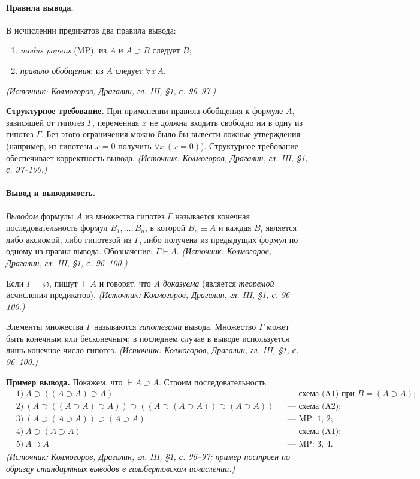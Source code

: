 \documentclass[a4paper,12pt]{article}
\begin{document}
\paragraph{Правила вывода.} В исчислении предикатов два правила вывода:
\begin{enumerate}[label=\arabic*)]
\item \emph{modus ponens} (MP): из \(A\) и \(A\supset B\) следует \(B\);
\item \emph{правило обобщения}: из \(A\) следует \(\forall x\,A\).
\end{enumerate}
\textit{(Источник: Колмогоров, Драгалин, гл. III, §1, с. 96--97.)}

\textbf{Структурное требование.} При применении правила обобщения к формуле \(A\), зависящей от гипотез \(\Gamma\), переменная \(x\) не должна входить свободно ни в одну из гипотез \(\Gamma\). Без этого ограничения можно было бы вывести ложные утверждения (например, из гипотезы \(x=0\) получить \(\forall x\,(x=0)\)). Структурное требование обеспечивает корректность вывода.
\textit{(Источник: Колмогоров, Драгалин, гл. III, §1, с. 97--100.)}

\paragraph{Вывод и выводимость.} \emph{Выводом} формулы \(A\) из множества гипотез \(\Gamma\) называется конечная последовательность формул \(B_1,\ldots,B_n\), в которой \(B_n\equiv A\) и каждая \(B_i\) является либо аксиомой, либо гипотезой из \(\Gamma\), либо получена из предыдущих формул по одному из правил вывода. Обозначение: \(\Gamma\vdash A\).
\textit{(Источник: Колмогоров, Драгалин, гл. III, §1, с. 96--100.)}

Если \(\Gamma=\varnothing\), пишут \(\vdash A\) и говорят, что \(A\) \emph{доказуема} (является \emph{теоремой} исчисления предикатов).
\textit{(Источник: Колмогоров, Драгалин, гл. III, §1, с. 96--100.)}

Элементы множества \(\Gamma\) называются \emph{гипотезами} вывода. Множество \(\Gamma\) может быть конечным или бесконечным; в последнем случае в выводе используется лишь конечное число гипотез.
\textit{(Источник: Колмогоров, Драгалин, гл. III, §1, с. 96--100.)}

\textbf{Пример вывода.} Покажем, что \(\vdash A\supset A\). Строим последовательность:
\[
\begin{aligned}
&1)\ A\supset((A\supset A)\supset A) &&\text{— схема (A1) при }B=(A\supset A);\\
&2)\ (A\supset((A\supset A)\supset A))\supset((A\supset(A\supset A))\supset(A\supset A)) &&\text{— схема (A2)};\\
&3)\ (A\supset(A\supset A))\supset(A\supset A) &&\text{— MP: 1, 2};\\
&4)\ A\supset(A\supset A) &&\text{— схема (A1)};\\
&5)\ A\supset A &&\text{— MP: 3, 4}.
\end{aligned}
\]
\textit{(Источник: Колмогоров, Драгалин, гл. III, §1, с. 96--97; пример построен по образцу стандартных выводов в гильбертовском исчислении.)}
\end{document}
